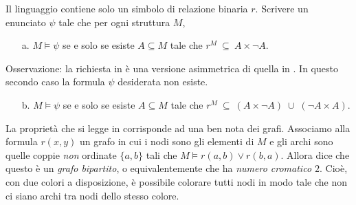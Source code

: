 \begin{exercise}\label{ex_grafo_bipartito}
Il linguaggio contiene solo un simbolo di relazione binaria $r$. Scrivere un enunciato $\psi$ tale che per ogni struttura $M$, 
\begin{itemize} 
\item[a.] $M\models\psi$ se e solo se esiste $A\subseteq M$ tale che $r^M\ \subseteq\ A\times\neg A$.
\end{itemize}
Osservazione: la richiesta in  \`e una versione asimmetrica di quella in . In questo secondo caso la formula $\psi$ desiderata non esiste. 
\begin{itemize} 
\item[b.] $M\models\psi$ se e solo se esiste $A\subseteq M$ tale che $r^M\ \subseteq\ (A\times \neg A)\;\cup\;(\neg A\times A)$.
\end{itemize}
La propriet\`a che si legge in  corrisponde ad una ben nota dei grafi. Associamo alla formula $r(x,y)$ un grafo in cui i nodi sono gli elementi di $M$ e gli archi sono quelle coppie \textit{non\/} ordinate $\{a,b\}$ tali che $M\models r(a,b)\vee r(b,a)$. Allora  dice che questo \`e un \textit{grafo bipartito}, o equivalentemente che ha \textit{numero cromatico $2$}. Cio\`e, con due colori a disposizione, \`e possibile colorare tutti nodi in modo tale che non ci siano archi tra nodi dello stesso colore. 
\end{exercise}
